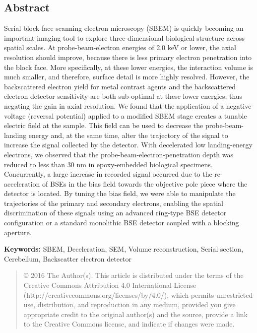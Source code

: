 \documentclass{article}
\begin{document}
\subsection*{Abstract}
Serial block-face scanning electron microscopy (SBEM) is quickly becoming an important imaging tool to explore three-dimensional biological structure across spatial scales. At probe-beam-electron energies of 2.0 keV or lower, the axial resolution should improve, because there is less primary electron penetration into the block face. More specifically, at these lower energies, the interaction volume is much smaller, and therefore, surface detail is more highly resolved. However, the backscattered electron yield for metal contrast agents and the backscattered electron detector sensitivity are both sub-optimal at these lower energies, thus negating the gain in axial resolution. We found that the application of a negative voltage (reversal potential) applied to a modified SBEM stage creates a tunable electric field at the sample. This field can be used to decrease the probe-beam-landing energy and, at the same time, alter the trajectory of the signal to increase the signal collected by the detector. With decelerated low landing-energy electrons, we observed that the probe-beam-electron-penetration depth was reduced to less than 30 nm in epoxy-embedded biological specimens. Concurrently, a large increase in recorded signal occurred due to the re-acceleration of BSEs in the bias field towards the objective pole piece where the detector is located. By tuning the bias field, we were able to manipulate the trajectories of the  primary and secondary electrons, enabling the spatial discrimination of these signals using an advanced ring-type BSE detector configuration or a standard monolithic BSE detector coupled with a blocking aperture.

\noindent\textbf{Keywords:} SBEM, Deceleration, SEM, Volume reconstruction, Serial section, Cerebellum, Backscatter electron detector

\begin{quote}\small
\noindent © 2016 The Author(s). This article is distributed under the terms of the Creative Commons Attribution 4.0 International License (http://creativecommons.org/licenses/by/4.0/), which permits unrestricted use, distribution, and reproduction in any medium, provided you give appropriate credit to the original author(s) and the source, provide a link to the Creative Commons license, and indicate if changes were made.
\end{quote}
\end{document}
